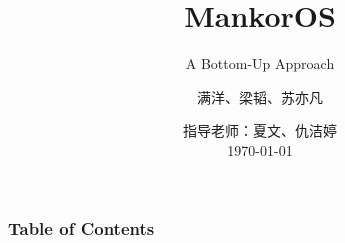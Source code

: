 \documentclass[aspectratio=169]{beamer}
\title{MankorOS}
\subtitle{A Bottom-Up Approach}
\author{满洋、梁韬、苏亦凡}
\institute[HITSZ]{哈尔滨工业大学（深圳）}
\date[\today]{ 指导老师：夏文、仇洁婷\\ \vspace{1em} \today}
\begin{document}
\frame{\titlepage}




\begin{frame}
    \frametitle{Table of Contents}
    \tableofcontents
\end{frame}







\end{document}
